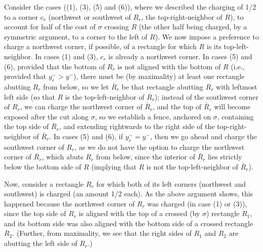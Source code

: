 \documentclass{article}
\begin{document}
Consider the cases ((1), (3), (5) and (6)), where we described the
charging of 1/2 to a corner $c_r$ (northwest or southwest of $R_r$,
the top-right-neighbor of $R$), to account for half of the cost of
$\sigma$ crossing $R$ (the other half being charged, by a symmetric
argument, to a corner to the left of $R$).
%
We now impose a preference to charge a northwest corner, if possible,
of a rectangle for which $R$ is its top-left-neighbor.  In cases (1)
and (3), $c_r$ is already a northwest corner. In cases (5) and (6),
provided that the bottom of $R_r$ is not aligned with the bottom of
$R$ (i.e., provided that $y_r^- > y^-$), there must be (by maximality)
at least one rectangle abutting $R_r$ from below, so we let $\bar R_r$
be that rectangle abutting $R_r$ with leftmost left side (so that $R$ is the top-left-neighbor of $\bar R_r$); instead of
the southwest corner of $R_r$, we can charge the northwest corner of
$\bar R_r$, and the top of $\bar R_r$ will become exposed after the
cut along $\sigma$, so we establish a fence, anchored on $\sigma$,
containing the top side of $\bar R_r$, and extending rightwards to the
right side of the top-right-neighbor of $\bar R_r$.  In cases (5) and
(6), if $y_r^- = y^-$, then we go ahead and charge the southwest
corner of $R_r$, as we do not have the option to charge the northwest
corner of $\bar R_r$, which abuts $R_r$ from below, since the interior
of $\bar R_r$ lies strictly below the bottom side of $R$ (implying
that $R$ is not the top-left-neighbor of $\bar R_r$).

Now, consider a rectangle $R_r$ for which both of its left corners
(northwest and southwest) is charged (an amount 1/2 each).  As the
above argument shows, this happened because the northwest corner of
$R_r$ was charged (in case (1) or (3)), since the top side of $R_r$ is
aligned with the top of a crossed (by $\sigma$) rectangle $R_1$, and
its bottom side was also aligned with the bottom side of a crossed
rectangle $R_2$.  (Further, from maximality, we see that the right
sides of $R_1$ and $R_2$ are abutting the left side of $R_r$.)
\end{document}

